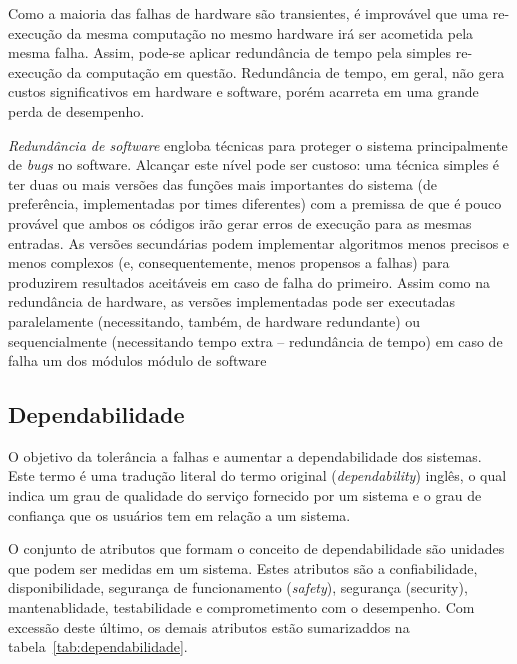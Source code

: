 Como a maioria das falhas de hardware são transientes, é improvável que uma re-execução da mesma computação no mesmo hardware irá ser acometida pela mesma falha. Assim, pode-se aplicar redundância de tempo pela simples re-execução da computação em questão. Redundância de tempo, em geral, não gera custos significativos em hardware e software, porém acarreta em uma grande perda de desempenho.

\emph{Redundância de software} engloba técnicas para proteger o sistema principalmente de \emph{bugs} no software. Alcançar este nível pode ser custoso: uma técnica simples é ter duas ou mais versões das funções mais importantes do sistema (de preferência, implementadas por times diferentes) com a premissa de que é pouco provável que ambos os códigos irão gerar erros de execução para as mesmas entradas. As versões secundárias podem implementar algoritmos menos precisos e menos complexos (e, consequentemente, menos propensos a falhas) para produzirem resultados aceitáveis em caso de falha do primeiro. Assim como na redundância de hardware, as versões implementadas pode ser executadas paralelamente (necessitando, também, de hardware redundante) ou sequencialmente (necessitando tempo extra -- redundância de tempo) em caso de falha um dos módulos módulo de software

\subsection{Dependabilidade} %
\label{sub:dependabilidade}

O objetivo da tolerância a falhas e aumentar a dependabilidade dos sistemas. Este termo é uma tradução literal do termo original (\emph{dependability}) inglês, o qual indica um grau de qualidade do serviço fornecido por um sistema e o grau de confiança que os usuários tem em relação a um sistema.

O conjunto de atributos que formam o conceito de dependabilidade são unidades que podem ser medidas em um sistema. Estes atributos são a confiabilidade, disponibilidade, segurança de funcionamento (\emph{safety}), segurança (security), mantenablidade, testabilidade e comprometimento com o desempenho. Com excessão deste último, os demais atributos estão sumarizaddos na tabela~\ref{tab:dependabilidade}.

